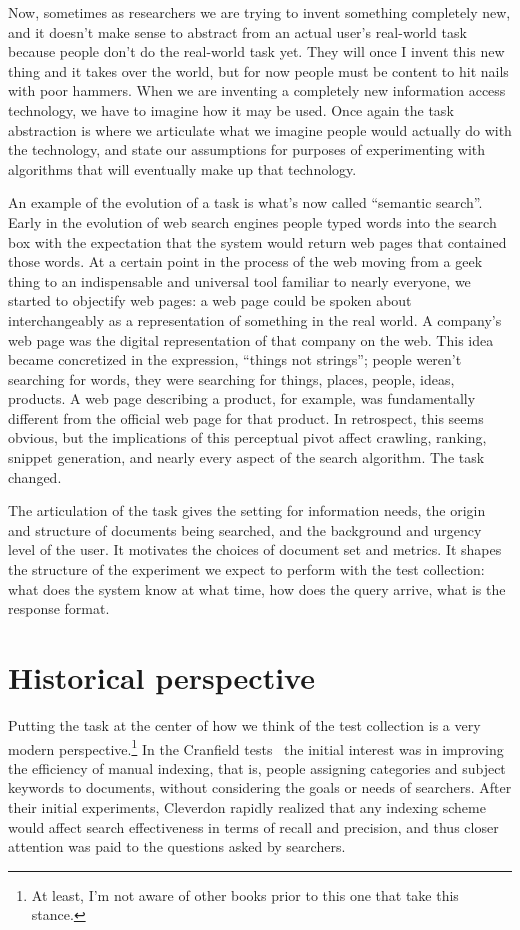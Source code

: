 \documentclass[nobib]{tufte-book}
\begin{document}
Now, sometimes as researchers we are trying to invent something completely new, and it doesn't make sense to abstract from an actual user's real-world task because people don't do the real-world task yet.  They will once I invent this new thing and it takes over the world, but for now people must be content to hit nails with poor hammers.  When we are inventing a completely new information access technology, we have to imagine how it may be used.  Once again the task abstraction is where we articulate what we imagine people would actually do with the technology, and state our assumptions for purposes of experimenting with algorithms that will eventually make up that technology.

An example of the evolution of a task is what's now called ``semantic search''.  Early in the evolution of web search engines people typed words into the search box with the expectation that the system would return web pages that contained those words.  At a certain point in the process of the web moving from a geek thing to an indispensable and universal tool familiar to nearly everyone, we started to objectify web pages: a web page could be spoken about interchangeably as a representation of something in the real world.  A company's web page was the digital representation of that company on the web.  This idea became concretized in the expression, ``things not strings'';\autocite{singhal_introducing_2012} people weren't searching for words, they were searching for things, places, people, ideas, products.  A web page describing a product, for example, was fundamentally different from the official web page for that product.  In retrospect, this seems obvious, but the implications of this perceptual pivot affect crawling, ranking, snippet generation, and nearly every aspect of the search algorithm.  The task changed.

The articulation of the task gives the setting for information needs, the origin and structure of documents being searched, and the background and urgency level of the user.  It motivates the choices of document set and metrics.  It shapes the structure of the experiment we expect to perform with the test collection: what does the system know at what time, how does the query arrive, what is the response format.

\section{Historical perspective}

Putting the task at the center of how we think of the test collection is a very modern perspective.\footnote{At least, I'm not aware of other books prior to this one that take this stance.}  In the Cranfield tests~\autocite{cleverdon_chapter_1966} the initial interest was in improving the efficiency of manual indexing, that is, people assigning categories and subject keywords to documents, without considering the goals or needs of searchers.  After their initial experiments, Cleverdon rapidly realized that any indexing scheme would affect search effectiveness in terms of recall and precision, and thus closer attention was paid to the questions asked by searchers.
\end{document}
